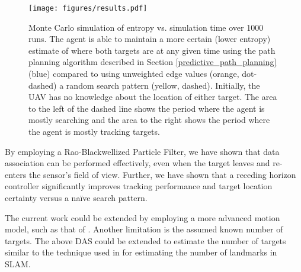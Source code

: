 \documentclass[letterpaper, 10 pt, conference]{ieeeconf}  %
\begin{document}
\begin{figure}
\texttt{[image: figures/results.pdf]}
\caption{Monte Carlo simulation of entropy vs. simulation time over 1000 runs. The agent is able to maintain a more certain (lower entropy) estimate of where both targets are at any given time using the path planning algorithm described in Section \ref{predictive_path_planning} (blue) compared to using unweighted edge values (orange, dot-dashed) a random search pattern (yellow, dashed). Initially, the UAV has no knowledge about the location of either target. The area to the left of the dashed line shows the period where the agent is mostly searching and the area to the right shows the period where the agent is mostly tracking targets.}
\label{fig:results}
\end{figure}


By employing a Rao-Blackwellized Particle Filter, we have shown that data association can be performed effectively, even when the target leaves and re-enters the sensor's field of view. Further, we have shown that a receding horizon controller significantly improves tracking performance and target location certainty versus a na\"{i}ve search pattern.

The current work could be extended by employing a more advanced motion model, such as that of \cite{Cheng2007}. Another limitation is the assumed known number of targets. The above DAS could be extended to estimate the number of targets similar to the technique used in \cite{Thrun2006} for estimating the number of landmarks in SLAM.

\addtolength{\textheight}{-12cm}   %

\end{document}
